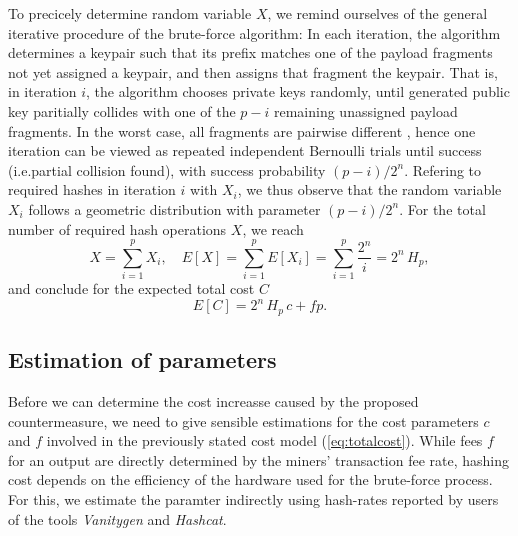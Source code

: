 \documentclass[10pt,a4paper,twocolumn]{article}
\begin{document}
To precicely determine random variable $X$, we remind ourselves of the general iterative procedure of the brute-force algorithm:
In each iteration, the algorithm determines a keypair such that its prefix matches one of the payload fragments not yet assigned a keypair, and then assigns that fragment the keypair.
That is, in iteration $i$, the algorithm chooses private keys randomly, until generated public key paritially collides with one of the $p-i$ remaining unassigned payload fragments.
In the worst case, all fragments are pairwise different%
, hence one iteration can be viewed as repeated independent Bernoulli trials until success (i.e.\@ partial collision found), with success probability $(p-i)/2^n$.  
Refering to required hashes in iteration $i$ with $X_i$, we thus observe that the random variable $X_i$ follows a geometric distribution with parameter $(p-i)/2^n$.
For the total number of required hash operations $X$, we reach
\[ X = \sum_{i=1}^{p} X_i, \quad E[X] = \sum_{i=1}^{p} E[X_i] = \sum_{i=1}^{p}\frac{2^n}{i} = 2^n\, H_p, \]
and conclude for the expected total cost $C$
\begin{equation}
    E[C] = 2^n\, H_p\,c + fp.\label{eq:totalcost}
\end{equation}


\subsection{Estimation of parameters}



Before we can determine the cost increasse caused by the proposed countermeasure, we need to give sensible estimations for the cost parameters $c$ and $f$ involved in the previously stated cost model (\ref{eq:totalcost}).
While fees $f$ for an output are directly determined by the miners' transaction fee rate, hashing cost depends on the efficiency of the hardware used for the brute-force process.
For this, we estimate the paramter indirectly using hash-rates reported by users of the tools \emph{Vanitygen} and \emph{Hashcat}.
\end{document}
